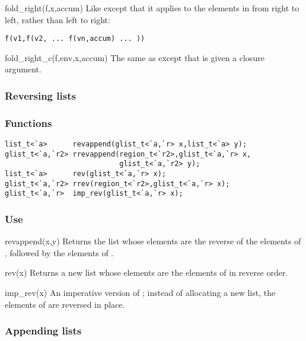\begin{defun}{fold_right}{(f,x,accum)}
Like  except that it applies  to the elements
in  from right to left, rather than left to right:

\begin{verbatim}
f(v1,f(v2, ... f(vn,accum) ... ))
\end{verbatim}
\end{defun}

\begin{defun}{fold_right_c}{(f,env,x,accum)}
The same as  except that  is given a closure
argument.
\end{defun}


\subsubsection*{Reversing lists}
\subsubsection*{Functions}
\begin{verbatim}
list_t<`a>      revappend(glist_t<`a,`r> x,list_t<`a> y);
glist_t<`a,`r2> rrevappend(region_t<`r2>,glist_t<`a,`r> x,
                           glist_t<`a,`r2> y);
list_t<`a>      rev(glist_t<`a,`r> x);
glist_t<`a,`r2> rrev(region_t<`r2>,glist_t<`a,`r> x);
glist_t<`a,`r>  imp_rev(glist_t<`a,`r> x);
\end{verbatim}

\subsubsection*{Use}

\begin{defun}{revappend}{(x,y)}
Returns the list whose elements are the reverse of the elements of
, followed by the elements of .
\end{defun}

\begin{defun}{rev}{(x)}
Returns a new list whose elements are the elements of  in reverse
order.
\end{defun}

\begin{defun}{imp_rev}{(x)}
An imperative version of ; instead of allocating a new
list, the elements of  are reversed in place.
\end{defun}

\subsubsection*{Appending lists}
